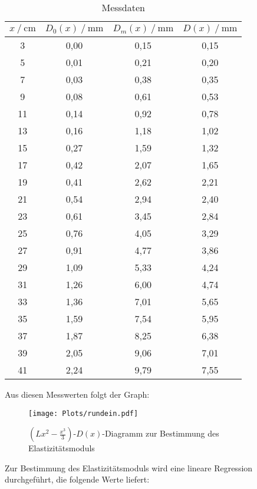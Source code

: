 \begin{table}[H]
  \centering
  \caption{Messdaten}
  \label{tab:rundein}
  \begin{tabular}{S S S S }
    \toprule
      {$x \:/\: \mathrm{cm}$} & {$D_0(x) \:/\: \mathrm{mm}$} & {$D_m(x) \:/\: \mathrm{mm}$} &
      {$D(x) \:/\: \mathrm{mm}$} \\
      &  0,00  &  0,15  &  0,15  \\
    5  &  0,01  &  0,21  &  0,20  \\
    7  &  0,03  &  0,38  &  0,35  \\
    9  &  0,08  &  0,61  &  0,53  \\
    11  &  0,14  &  0,92  &  0,78 \\
    13  &  0,16  &  1,18  &  1,02 \\
    15  &  0,27  &  1,59  &  1,32 \\
    17  &  0,42  &  2,07  &  1,65 \\
    19  &  0,41  &  2,62  &  2,21 \\
    21  &  0,54  &  2,94  &  2,40 \\
    23  &  0,61  &  3,45  &  2,84 \\
    25  &  0,76  &  4,05  &  3,29 \\
    27  &  0,91  &  4,77  &  3,86 \\
    29  &  1,09  &  5,33  &  4,24 \\
    31  &  1,26  &  6,00  &  4,74 \\
    33  &  1,36  &  7,01  &  5,65 \\
    35  &  1,59  &  7,54  &  5,95 \\
    37  &  1,87  &  8,25  &  6,38 \\
    39  &  2,05  &  9,06  &  7,01 \\
    41  &  2,24  &  9,79  &  7,55 \\
    \bottomrule
  \end{tabular}
\end{table}

\newpage

Aus diesen Messwerten folgt der Graph:

\begin{figure}[H]
  \centering
  \texttt{[image: Plots/rundein.pdf]}
  \caption{$\left(L x^2 - \frac{x^3}{3}\right)$-$D(x)$-Diagramm zur Bestimmung des Elastizitätsmoduls}
  \label{fig:rundein}
\end{figure}

Zur Bestimmung des Elastizitätsmoduls wird eine lineare Regression durchgeführt, die folgende Werte liefert:

